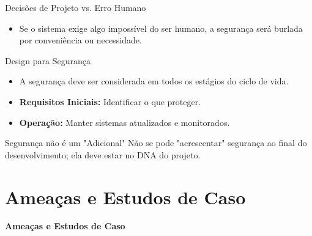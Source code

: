 \documentclass[aspectratio=169]{beamer}
\begin{document}
\begin{frame}{Decisões de Projeto vs. Erro Humano}
    \centering
    \vspace{0.5cm}
    \begin{itemize}
        \item Se o sistema exige algo impossível do ser humano, a segurança será burlada por conveniência ou necessidade.
    \end{itemize}
\end{frame}

\begin{frame}{Design para Segurança}
    \begin{itemize}
        \item A segurança deve ser considerada em todos os estágios do ciclo de vida.
        \item \textbf{Requisitos Iniciais:} Identificar o que proteger.
        \item \textbf{Operação:} Manter sistemas atualizados e monitorados.
    \end{itemize}
    \begin{exampleblock}{Segurança não é um "Adicional"}
        Não se pode "acrescentar" segurança ao final do desenvolvimento; ela deve estar no DNA do projeto.
    \end{exampleblock}
\end{frame}

\section{Ameaças e Estudos de Caso}
{
\begin{frame}[plain]
    \centering
    \Huge \color{white} \bfseries Ameaças e Estudos de Caso
\end{frame}
}
\end{document}
